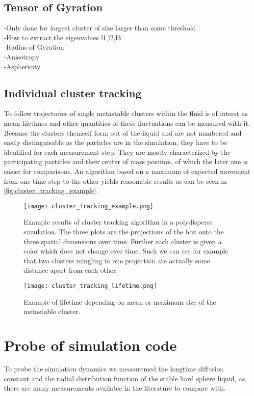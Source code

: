 \subsection{Tensor of Gyration}
\label{sec:ToG}
-Only done for largest cluster of size larger than some threshold\\
-How to extract the eigenvalues l1,l2,l3\\
-Radius of Gyration\\
-Anisotropy\\
-Asphericity\\

\subsection{Individual cluster tracking}
\label{sec:tracking}
To follow trajectories of single metastable clusters within the fluid is of interst as mean lifetimes and other quantities of these fluctuations can be measured with it. Because the clusters themself form out of the liquid and are not numbered and easily distinguisable as the particles are in the simulation, they have to be identified for each measurement step. They are mostly characterized by the participating particles and their center of mass position, of which the later one is easier for comparisons. An algorithm based on a maximum of expected movement from one time step to the other yields reasonable results as can be seen in \autoref{fig:cluster_tracking_example}.


\begin{figure}[h]
\centering
\texttt{[image: cluster\_tracking\_example.png]}
\caption{Example results of cluster tracking algorithm in a polydisperse simulation. The three plots are the projections of the box onto the three spatial dimensions over time. Further each cluster is given a color which does not change over time. Such we can see for example that two clusters mingling in one projection are actually some distance apart from each other.}
\label{fig:cluster_tracking_example}
\end{figure}

\begin{figure}[h]
\centering
\texttt{[image: cluster\_tracking\_lifetime.png]}
\caption{Example of lifetime depending on mean or maximum size of the metastable cluster.}
\label{fig:lifetime}
\end{figure}



\section{Probe of simulation code}
\label{sec:probe}
To probe the simulation dynamics we measuremed the longtime diffusion constant and the radial distribution function of the stable hard sphere liquid, as there are many measurements available in the literature to compare with.

